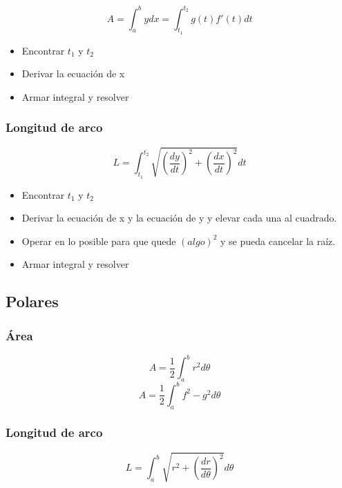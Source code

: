 $$A=\int^b_a ydx=\int_{t_1}^{t_2} g(t)f'(t)dt$$
\begin{itemize}
	\item Encontrar $t_1$ y $t_2$
	\item Derivar la ecuación de x
	\item Armar integral y resolver
\end{itemize}

\subsubsection{Longitud de arco}
$$L=\int^{t_2}_{t_1}\sqrt{\left( \dfrac{dy}{dt} \right)^2 +\left( \dfrac{dx}{dt} \right)^2}dt$$

\begin{itemize}
	\item Encontrar $t_1$ y $t_2$
	\item Derivar la ecuación de x y la ecuación de y y elevar cada una al cuadrado.
	\item Operar en lo posible para que quede $(algo)^2$ y se pueda cancelar la raíz.
	\item Armar integral y resolver
\end{itemize}

\subsection{Polares}

\subsubsection{Área}

$$A=\dfrac{1}{2}\int^b_a r^2d\theta$$
$$A=\dfrac{1}{2}\int^b_a f^2-g^2d\theta$$

\subsubsection{Longitud de arco}
$$L=\int^b_a\sqrt{ r^2+\left( \dfrac{dr}{d\theta} \right)^2}d\theta$$